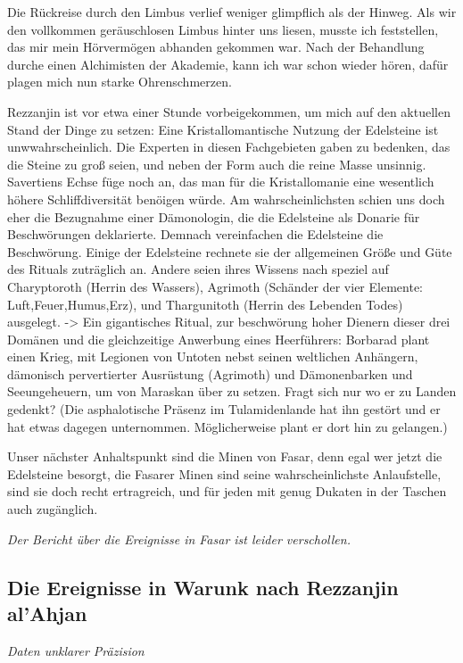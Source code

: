 Die Rückreise durch den Limbus verlief weniger glimpflich als der Hinweg. Als wir den vollkommen geräuschlosen Limbus hinter uns liesen, musste ich feststellen, das mir mein Hörvermögen abhanden gekommen war. Nach der Behandlung durche einen Alchimisten der Akademie, kann ich war schon wieder hören, dafür plagen mich nun starke Ohrenschmerzen.

Rezzanjin ist vor etwa einer Stunde vorbeigekommen, um mich auf den aktuellen Stand der Dinge zu setzen:
Eine Kristallomantische Nutzung der Edelsteine ist unwwahrscheinlich. Die Experten in diesen Fachgebieten gaben zu bedenken, das die Steine zu groß seien, und neben der Form auch die reine Masse unsinnig. Savertiens Echse füge noch an, das man für die Kristallomanie eine wesentlich höhere Schliffdiversität benöigen würde.
Am wahrscheinlichsten schien uns doch eher die Bezugnahme einer Dämonologin, die die Edelsteine als Donarie für Beschwörungen deklarierte.
Demnach vereinfachen die Edelsteine die Beschwörung. Einige der Edelsteine rechnete sie der allgemeinen Größe und Güte des Rituals zuträglich an. Andere seien ihres Wissens nach speziel auf Charyptoroth (Herrin des Wassers), Agrimoth (Schänder der vier Elemente: Luft,Feuer,Humus,Erz), und Thargunitoth (Herrin des Lebenden Todes) ausgelegt. -> Ein gigantisches Ritual, zur beschwörung hoher Dienern dieser drei Domänen und die gleichzeitige Anwerbung eines Heerführers: Borbarad plant einen Krieg, mit Legionen von Untoten nebst seinen weltlichen Anhängern, dämonisch pervertierter Ausrüstung (Agrimoth) und Dämonenbarken und Seeungeheuern, um von Maraskan über zu setzen. Fragt sich nur wo er zu Landen gedenkt? (Die asphalotische Präsenz im Tulamidenlande hat ihn gestört und er hat etwas dagegen unternommen. Möglicherweise plant er dort hin zu gelangen.)

Unser nächster Anhaltspunkt sind die Minen von Fasar, denn egal wer jetzt die Edelsteine besorgt, die Fasarer Minen sind seine wahrscheinlichste Anlaufstelle, sind sie doch recht ertragreich, und für jeden mit genug Dukaten in der Taschen auch zugänglich.

\emph{Der Bericht über die Ereignisse in Fasar ist leider verschollen.}

\subsection{Die Ereignisse in Warunk nach Rezzanjin al'Ahjan}

\emph{Daten unklarer Präzision}

